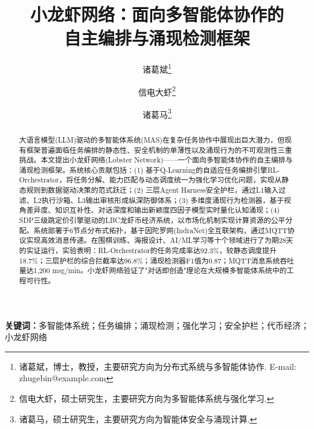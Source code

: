 \documentclass[12pt,a4paper]{ctexart}
\title{\textbf{小龙虾网络：面向多智能体协作的\\自主编排与涌现检测框架}}
\author{诸葛斌\thanks{诸葛斌，博士，教授，主要研究方向为分布式系统与多智能体协作. E-mail: zhugebin@example.com}%
\and 信电大虾\thanks{信电大虾，硕士研究生，主要研究方向为多智能体系统与强化学习.}%
\and 诸葛马\thanks{诸葛马，硕士研究生，主要研究方向为智能体安全与涌现计算.}}
\date{}
\begin{document}
\maketitle

\begin{abstract}
大语言模型(LLM)驱动的多智能体系统(MAS)在复杂任务协作中展现出巨大潜力，但现有框架普遍面临任务编排的静态性、安全机制的单薄性以及涌现行为的不可观测性三重挑战。本文提出小龙虾网络(Lobster Network)——一个面向多智能体协作的自主编排与涌现检测框架。系统核心贡献包括：(1) 基于Q-Learning的自适应任务编排引擎RL-Orchestrator，将任务分解、能力匹配与动态调度统一为强化学习优化问题，实现从静态规则到数据驱动决策的范式跃迁；(2) 三层Agent Harness安全护栏，通过L1输入过滤、L2执行沙箱、L3输出审核形成纵深防御体系；(3) 多维度涌现行为检测器，基于视角差异度、知识互补性、对话深度和输出新颖度四因子模型实时量化认知涌现；(4) SDP三级跳定价引擎驱动的LBC龙虾币经济系统，以市场化机制实现计算资源的公平分配。系统部署于6节点分布式拓扑，基于因陀罗网(IndraNet)全互联架构，通过MQTT协议实现高效消息传递。在围棋训练、海报设计、AI/ML学习等十个领域进行了为期28天的实证运行，实验表明：RL-Orchestrator的任务完成率达92.3\%，较静态调度提升18.7\%；三层护栏的综合拦截率达96.8\%；涌现检测器F1值为0.87；MQTT消息系统吞吐量达1,200 msg/min。小龙虾网络验证了"对话即创造"理论在大规模多智能体系统中的工程可行性。
\end{abstract}

\noindent\textbf{关键词：}多智能体系统；任务编排；涌现检测；强化学习；安全护栏；代币经济；小龙虾网络

\vspace{1cm}
\end{document}
